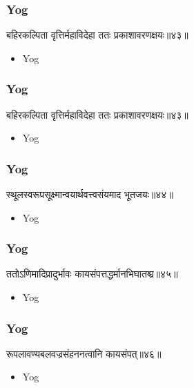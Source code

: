 \begin{frame}[fragile]\frametitle{Yog}
\begin{sanskrit}
बहिरकल्पिता वृत्तिर्महाविदेहा ततः प्रकाशावरणक्षयः॥४३॥
\end{sanskrit}
	\begin{itemize}
	\item Yog 
	\end{itemize}
\end{frame}

\begin{frame}[fragile]\frametitle{Yog}
\begin{sanskrit}
बहिरकल्पिता वृत्तिर्महाविदेहा ततः प्रकाशावरणक्षयः॥४३॥
\end{sanskrit}
	\begin{itemize}
	\item Yog 
	\end{itemize}
\end{frame}


\begin{frame}[fragile]\frametitle{Yog}
\begin{sanskrit}
स्थूलस्वरूपसूक्ष्मान्वयार्थवत्त्वसंयमाद भूतजयः॥४४॥
\end{sanskrit}
	\begin{itemize}
	\item Yog 
	\end{itemize}
\end{frame}

\begin{frame}[fragile]\frametitle{Yog}
\begin{sanskrit}
ततोऽणिमादिप्रादुर्भावः कायसंपत्तद्धर्मानभिघातश्च॥४५॥
\end{sanskrit}
	\begin{itemize}
	\item Yog 
	\end{itemize}
\end{frame}


\begin{frame}[fragile]\frametitle{Yog}
\begin{sanskrit}
रूपलावण्यबलवज्रसंहननत्वानि कायसंपत्॥४६॥
\end{sanskrit}
	\begin{itemize}
	\item Yog 
	\end{itemize}
\end{frame}



